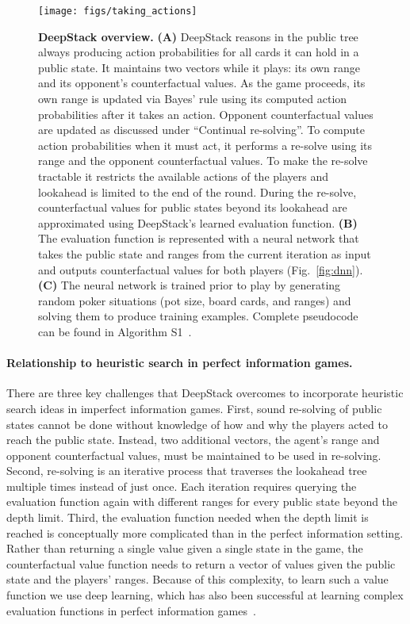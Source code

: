 \documentclass[12pt]{article}
\newif\iffinal
\begin{document}
\iffinal\else 
\begin{figure}[t]
\centering
\texttt{[image: figs/taking\_actions]}
\caption{%
{\bf DeepStack overview.} 
{\bf (A)} DeepStack reasons in the public tree always producing action probabilities for all cards it can hold in a public state.  It maintains two vectors while it plays: its own range and its opponent's counterfactual values.  As the game proceeds, its own range is updated via Bayes' rule using its computed action probabilities after it takes an action.  Opponent counterfactual values are updated as discussed under ``Continual re-solving''.  To compute action probabilities when it must act, it performs a re-solve using its range and the opponent counterfactual values.  To make the re-solve tractable it restricts the available actions of the players and lookahead is limited to the end of the round.
During the re-solve, counterfactual values for public states beyond its lookahead are approximated using DeepStack's learned evaluation function.  {\bf (B)} The evaluation function is represented with a neural network that takes the public state and ranges from the current iteration as input and outputs counterfactual values for both players (Fig.~\ref{fig:dnn}).  {\bf (C)} The neural network is trained prior to play by generating random poker situations (pot size, board cards, and ranges) and solving them to produce training examples.  Complete pseudocode can be found in Algorithm S1~\cite{SOM}.%
}
\label{fig:deepstack-overview}
\end{figure}
\fi

\paragraph*{Relationship to heuristic search in perfect information games.}

There are three key challenges that DeepStack overcomes to incorporate heuristic search ideas in imperfect information games.
First, sound re-solving of public states cannot be done without knowledge of how and why the players acted to reach the public state.  Instead, two additional vectors, the agent's range and opponent counterfactual values, must be maintained to be used in re-solving.  Second, re-solving is an iterative process that traverses the lookahead tree multiple times instead of just once.  Each iteration requires querying the evaluation function again with different ranges for every public state beyond the depth limit.
Third, the evaluation function needed when the depth limit is reached is conceptually more complicated than in the perfect information setting.  Rather than returning a single value given a single state in the game, the counterfactual value function needs to return a vector of values given the public state and the players' ranges.  
Because of this complexity, to learn such a value function we use deep learning, which has also been successful at learning complex evaluation functions in perfect information games~\cite{Silver16:AlphaGo}.
\end{document}

